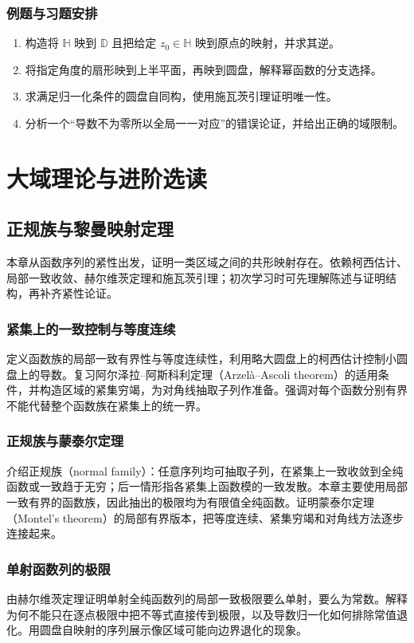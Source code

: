 \documentclass[UTF8,12pt,a4paper,fontset=fandol]{ctexbook}
\begin{document}
\section{例题与习题安排}
\begin{enumerate}
  \item 构造将 $\mathbb{H}$ 映到 $\mathbb{D}$ 且把给定 $z_0\in\mathbb{H}$ 映到原点的映射，并求其逆。
  \item 将指定角度的扇形映到上半平面，再映到圆盘，解释幂函数的分支选择。
  \item 求满足归一化条件的圆盘自同构，使用施瓦茨引理证明唯一性。
  \item 分析一个“导数不为零所以全局一一对应”的错误论证，并给出正确的域限制。
\end{enumerate}


\part{大域理论与进阶选读}

\chapter{正规族与黎曼映射定理}
\label{chap:ca-normal}

本章从函数序列的紧性出发，证明一类区域之间的共形映射存在。依赖柯西估计、局部一致收敛、赫尔维茨定理和施瓦茨引理；初次学习时可先理解陈述与证明结构，再补齐紧性论证。

\section{紧集上的一致控制与等度连续}
定义函数族的局部一致有界性与等度连续性，利用略大圆盘上的柯西估计控制小圆盘上的导数。复习阿尔泽拉--阿斯科利定理（Arzelà--Ascoli theorem）的适用条件，并构造区域的紧集穷竭，为对角线抽取子列作准备。强调对每个函数分别有界不能代替整个函数族在紧集上的统一界。

\section{正规族与蒙泰尔定理}
介绍正规族（normal family）：任意序列均可抽取子列，在紧集上一致收敛到全纯函数或一致趋于无穷；后一情形指各紧集上函数模的一致发散。本章主要使用局部一致有界的函数族，因此抽出的极限均为有限值全纯函数。证明蒙泰尔定理（Montel's theorem）的局部有界版本，把等度连续、紧集穷竭和对角线方法逐步连接起来。

\section{单射函数列的极限}
由赫尔维茨定理证明单射全纯函数列的局部一致极限要么单射，要么为常数。解释为何不能只在逐点极限中把不等式直接传到极限，以及导数归一化如何排除常值退化。用圆盘自映射的序列展示像区域可能向边界退化的现象。
\end{document}
